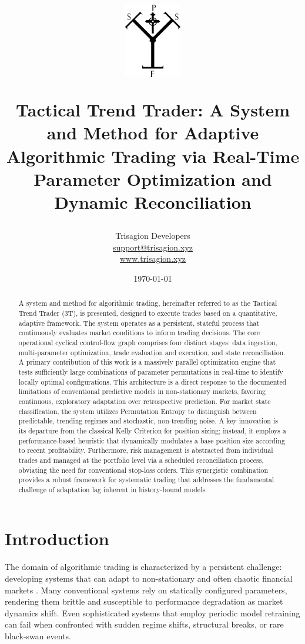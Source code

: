 \documentclass[10pt]{article}
\title{%
\includegraphics[width=2.5cm]{TTT.pdf}

\textbf{Tactical Trend Trader: A System and Method for Adaptive Algorithmic Trading via Real-Time Parameter Optimization and Dynamic Reconciliation}}
\author{Trisagion Developers \\
        \href{mailto:support@trisagion.xyz}{support@trisagion.xyz} \\
        \url{www.trisagion.xyz}}
\date{\today}
\begin{document}
\maketitle

\begin{abstract}
A system and method for algorithmic trading, hereinafter referred to as the Tactical Trend Trader (3T), is presented, designed to execute trades based on a quantitative, adaptive framework. The system operates as a persistent, stateful process that continuously evaluates market conditions to inform trading decisions. The core operational cyclical control-flow graph comprises four distinct stages: data ingestion, multi-parameter optimization, trade evaluation and execution, and state reconciliation. A primary contribution of this work is a massively parallel optimization engine that tests sufficiently large combinations of parameter permutations in real-time to identify locally optimal configurations. This architecture is a direct response to the documented limitations of conventional predictive models in non-stationary markets, favoring continuous, exploratory adaptation over retrospective prediction. For market state classification, the system utilizes Permutation Entropy to distinguish between predictable, trending regimes and stochastic, non-trending noise. A key innovation is its departure from the classical Kelly Criterion for position sizing; instead, it employs a performance-based heuristic that dynamically modulates a base position size according to recent profitability. Furthermore, risk management is abstracted from individual trades and managed at the portfolio level via a scheduled reconciliation process, obviating the need for conventional stop-loss orders. This synergistic combination provides a robust framework for systematic trading that addresses the fundamental challenge of adaptation lag inherent in history-bound models.
\end{abstract}

\section{Introduction}
The domain of algorithmic trading is characterized by a persistent challenge: developing systems that can adapt to non-stationary and often chaotic financial markets \cite{ref:nonstationarity}. Many conventional systems rely on statically configured parameters, rendering them brittle and susceptible to performance degradation as market dynamics shift. Even sophisticated systems that employ periodic model retraining can fail when confronted with sudden regime shifts, structural breaks, or rare black-swan events.
\end{document}
